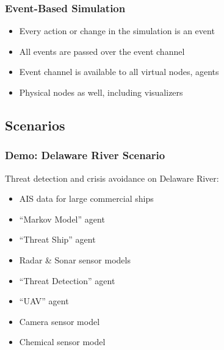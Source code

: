 \documentclass[mathserif,usenames,dvipsnames]{beamer}
\begin{document}
\frame
{
    \frametitle{Event-Based Simulation}
    \begin{itemize}
        \item Every action or change in the simulation is an event
        \item All events are passed over the event channel
        \item Event channel is available to all virtual nodes, agents
        \item Physical nodes as well, including visualizers
    \end{itemize}
}


\subsection{Scenarios}

\frame
{
    \frametitle{Demo: Delaware River Scenario}
    Threat detection and crisis avoidance on Delaware River:
    \begin{itemize}
        \item AIS data for large commercial ships
        \item ``Markov Model'' agent
        \item ``Threat Ship'' agent
        \item Radar \& Sonar sensor models
        \item ``Threat Detection'' agent
        \item ``UAV'' agent
        \item Camera sensor model
        \item Chemical sensor model

    \end{itemize}
}
\end{document}
